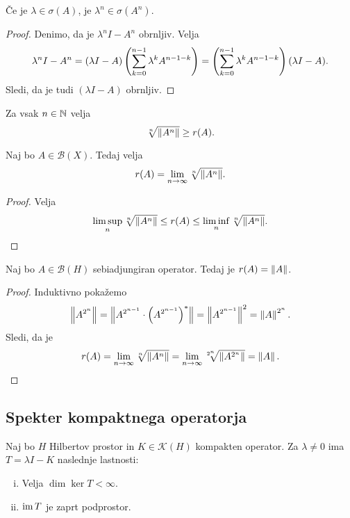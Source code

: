 \begin{trditev}
Če je $\lambda \in \sigma(A)$, je $\lambda^n \in \sigma(A^n)$.
\end{trditev}

\begin{proof}
Denimo, da je $\lambda^n I - A^n$ obrnljiv. Velja
\[
\lambda^n I - A^n =
(\lambda I - A)\left(\sum_{k=0}^{n-1} \lambda^k A^{n-1-k}\right) =
\left(\sum_{k=0}^{n-1} \lambda^k A^{n-1-k}\right)(\lambda I - A).
\]
Sledi, da je tudi $(\lambda I - A)$ obrnljiv.
\end{proof}

\begin{lema}
Za vsak $n \in \mathbb{N}$ velja
\[
\sqrt[n]{\left\lVert A^n\right\rVert} \geq r(A).
\]
\end{lema}

\obvs

\begin{izrek}
Naj bo $A \in \mathcal{B}(X)$. Tedaj velja
\[
r(A) = \lim_{n \to \infty} \sqrt[n]{\left\lVert A^n\right\rVert}.
\]
\end{izrek}

\begin{proof}
Velja
\[
\limsup_n \sqrt[n]{\left\lVert A^n\right\rVert} \leq
r(A) \leq
\liminf_n \sqrt[n]{\left\lVert A^n\right\rVert}. \qedhere
\]
\end{proof}

\begin{posledica}
Naj bo $A \in \mathcal{B}(H)$ sebiadjungiran operator. Tedaj je
$r(A) = \left\lVert A\right\rVert$.
\end{posledica}

\begin{proof}
Induktivno pokažemo
\[
\left\lVert A^{2^n}\right\rVert = \left\lVert A^{2^{n-1}} \cdot \left(A^{2^{n-1}}\right)^*\right\rVert =
\left\lVert A^{2^{n-1}}\right\rVert^2 = \left\lVert A\right\rVert^{2^n}.
\]
Sledi, da je
\[
r(A) = \lim_{n \to \infty} \sqrt[n]{\left\lVert A^n\right\rVert} =
\lim_{n \to \infty} \sqrt[2^n]{\left\lVert A^{2^n}\right\rVert} =
\left\lVert A\right\rVert. \qedhere
\]
\end{proof}

\newpage

\subsection{Spekter kompaktnega operatorja}

\begin{trditev}
Naj bo $H$ Hilbertov prostor in $K \in \mathcal{K}(H)$ kompakten
operator. Za $\lambda \ne 0$ ima $T = \lambda I - K$ naslednje
lastnosti:

\begin{enumerate}[i)]
\item Velja $\dim \ker T < \infty$.
\item $\operatorname{im} T$ je zaprt podprostor.
\end{enumerate}
\end{trditev}

